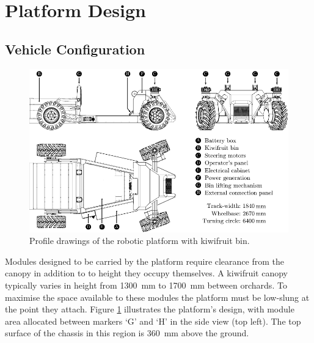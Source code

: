 \documentclass[preprint,authoryear,12pt]{elsarticle}
\begin{document}
\section{Platform Design}

    \subsection{Vehicle Configuration}
    \label{sect:mechanical}

        \begin{figure}[htb]
            \centering
            \includegraphics[width=\linewidth]{imgs/profile_views/AMMP-All-Labelled.pdf}
            \caption{Profile drawings of the robotic platform with kiwifruit bin.}
            \label{fig:AMMP}
        \end{figure}

        Modules designed to be carried by the platform require clearance from the canopy in addition to to height they occupy themselves.
        A kiwifruit canopy typically varies in height from \SI{1300}{\milli\meter} to \SI{1700}{\milli\meter} between orchards.
        To maximise the space available to these modules the platform must be low-slung at the point they attach.
        Figure \ref{fig:AMMP} illustrates the platform's design, with module area allocated between markers `G' and `H' in the side view (top left).
        The top surface of the chassis in this region is \SI{360}{\milli\meter} above the ground.
\end{document}
